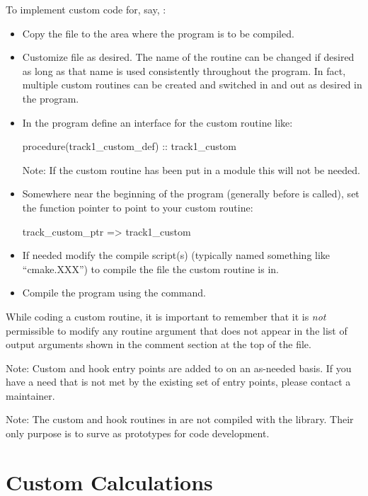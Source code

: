 To implement custom code for, say, :
\begin{itemize}
%
\item 
Copy the file  to the area where the program is to be compiled.
%
\item
Customize file as desired. The name of the routine can be changed if desired as long as that name is used
consistently throughout the program. In fact, multiple custom
routines can be created and switched in and out as desired in the program.
%
\item
In the program define an interface for the custom routine like:
\begin{example}
  procedure(track1_custom_def) :: track1_custom
\end{example}
Note: If the custom routine has been put in a module this will not be needed.
%
\item
Somewhere near the beginning of the program (generally before  is called), set the
function pointer to point to your custom routine:
\begin{example}
  track_custom_ptr => track1_custom
\end{example}
%
\item
If needed modify the compile script(s) (typically named something like ``cmake.XXX'') to compile the
file the custom routine is in.
%
\item
Compile the program using the  command.
%
\end{itemize}

While coding a custom routine, it is important to remember that it is {\em not} permissible to
modify any routine argument that does not appear in the list of output arguments shown in the
comment section at the top of the file.

Note: Custom and hook entry points are added to \bmad on an as-needed basis. If you have a need that
is not met by the existing set of entry points, please contact a \bmad maintainer.

Note: The custom and hook routines in  are not compiled with the \bmad library. Their
only purpose is to surve as prototypes for code development.

\section{Custom Calculations}
\label{s:custom.ele}


